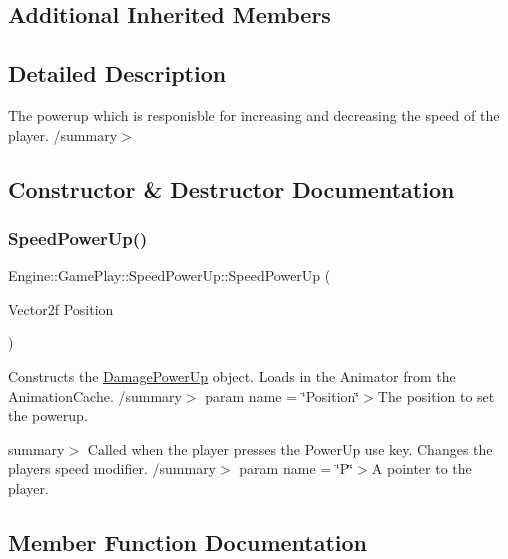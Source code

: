 \subsection*{Additional Inherited Members}


\subsection{Detailed Description}
The powerup which is responisble for increasing and decreasing the speed of the player. /summary$>$ 

\subsection{Constructor \& Destructor Documentation}
\mbox{\label{class_engine_1_1_game_play_1_1_speed_power_up_ac619eef8e87815cc58a256ddde54d049}} 
\subsubsection{\texorpdfstring{Speed\+Power\+Up()}{SpeedPowerUp()}}
{\footnotesize\ttfamily Engine\+::\+Game\+Play\+::\+Speed\+Power\+Up\+::\+Speed\+Power\+Up (\begin{DoxyParamCaption}\item[{Vector2f}]{Position }\end{DoxyParamCaption})}



Constructs the \hyperlink{class_engine_1_1_game_play_1_1_damage_power_up}{Damage\+Power\+Up} object. Loads in the Animator from the Animation\+Cache. /summary$>$ param name = \char`\"{}\+Position\char`\"{}$>$The position to set the powerup.

summary$>$ Called when the player presses the Power\+Up use key. Changes the players speed modifier. /summary$>$ param name = \char`\"{}\+P\char`\"{}$>$A pointer to the player.

\subsection{Member Function Documentation}
\mbox{\label{class_engine_1_1_game_play_1_1_speed_power_up_a0901961fb01656a2b81ccf846e370e31}} 
